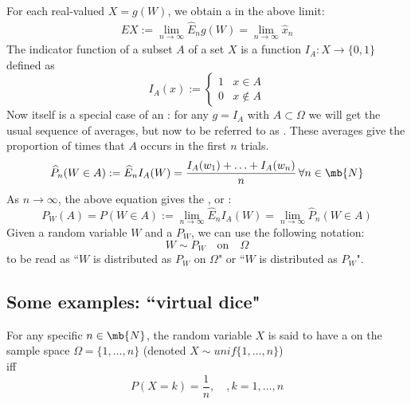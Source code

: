 \documentclass[11pt]{article}
\numberwithin{equation}{section}
\begin{document}
For each real-valued $X = g(W)$, we obtain a  in the above limit:
\begin{align}
	EX := \lim_{n \rightarrow \infty} \widehat{E}_n g(W) = \lim_{n \rightarrow \infty} \hat{x}_n
\end{align}
 The indicator function of a subset $A$ of a set $X$ is a function $I_A: X \rightarrow \{0, 1\}$ defined as
\begin{equation}
	I_A(x) := \begin{cases}
		1 & x \in A\\
		0 & x \notin A
	\end{cases}
\end{equation}
Now  itself is a special case of an : for any  $g = I_A$ with $A \subset \Omega$ we will get the usual sequence of averages, but now to be referred to as . These averages give the proportion of times that $A$ occurs in the first $n$ trials.
\begin{equation}
	\widehat{P}_n(W \in A) := \widehat{E}_n I_A(W) = \frac{I_A(w_1) + \hdots + I_A(w_n)}{n} \, \forall n \in \mb{N}
\end{equation}
As $n \rightarrow \infty$, the above equation gives the , or :
\begin{equation}
	P_W(A) = P(W \in A) := \lim_{n \rightarrow \infty}\widehat{E}_n I_A(W) = \lim_{n \rightarrow \infty}\widehat{P}_n (W \in A)
\end{equation}
\notation Given a random variable $W$ and a  $P_W$, we can use the following notation:
$$W \sim P_W \quad \text{on} \quad \Omega$$
to be read as ``$W$ is distributed as $P_W$ on $\Omega$" or ``$W$ is distributed as $P_W$".

\subsection{Some examples: ``virtual dice"}
 \label{physical} For any specific $n \in \mb{N}$, the random variable $X$ is said to have a  on the sample space $\Omega = \{1, \hdots, n\}$ (denoted $X \sim unif\{1, \hdots, n\}$)\\
iff\\
\begin{equation}
P(X = k) = \frac{1}{n}, \quad, k = 1, \hdots, n
\end{equation}
\end{document}
